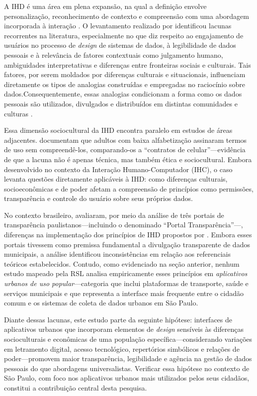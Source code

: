 \documentclass[
	12pt,				%
	oneside,			%
	a4paper,			%
	english,			%
	brazil				%
	]{abntex2ppgsi}
\begin{document}
    A IHD é uma área em plena expansão, na qual a definição envolve personalização, reconhecimento de contexto e compreensão com uma abordagem incorporada à interação \cite{VICTORELLI2020Understanding}. O levantamento realizado por  identificou lacunas recorrentes na literatura, especialmente no que diz respeito ao engajamento de usuários no processo de \textit{design} de sistemas de dados, à legibilidade de dados pessoais e à relevância de fatores contextuais como julgamento humano, ambiguidades interpretativas e diferenças entre fronteiras sociais e culturais. Tais fatores, por serem moldados por diferenças culturais e situacionais, influenciam diretamente os tipos de analogias construídas e empregadas no raciocínio sobre dados.Consequentemente, essas analogias condicionam a forma como os dados pessoais são utilizados, divulgados e distribuídos em distintas comunidades e culturas \cite{Victorelli2020Human, VICTORELLI2020Understanding}.

    Essa dimensão sociocultural da IHD encontra paralelo em estudos de áreas adjacentes.  documentam que adultos com baixa alfabetização assinaram termos de uso sem compreendê-los, comparando-os a ``contratos de celular''---evidência de que a lacuna não é apenas técnica, mas também ética e sociocultural. Embora desenvolvido no contexto da Interação Humano-Computador (IHC), o caso levanta questões diretamente aplicáveis à IHD: como diferenças culturais, socioeconômicas e de poder afetam a compreensão de princípios como permissões, transparência e controle do usuário sobre seus próprios dados.

    No contexto brasileiro,  avaliaram, por meio da análise de três portais de transparência paulistanos---incluindo o denominado ``Portal Transparência''---, diferenças na implementação dos princípios de IHD propostos por . Embora esses portais tivessem como premissa fundamental a divulgação transparente de dados municipais, a análise identificou inconsistências em relação aos referenciais teóricos estabelecidos. Contudo, como evidenciado na seção anterior, nenhum estudo mapeado pela RSL analisa empiricamente esses princípios em \emph{aplicativos urbanos de uso popular}---categoria que inclui plataformas de transporte, saúde e serviços municipais e que representa a interface mais frequente entre o cidadão comum e os sistemas de coleta de dados urbanos em São Paulo.

    Diante dessas lacunas, este estudo parte da seguinte hipótese: interfaces de aplicativos urbanos que incorporam elementos de \textit{design} sensíveis às diferenças socioculturais e econômicas de uma população específica---considerando variações em letramento digital, acesso tecnológico, repertórios simbólicos e relações de poder---promovem maior transparência, legibilidade e agência na gestão de dados pessoais do que abordagens universalistas. Verificar essa hipótese no contexto de São Paulo, com foco nos aplicativos urbanos mais utilizados pelos seus cidadãos, constitui a contribuição central desta pesquisa.
    
\end{document}
